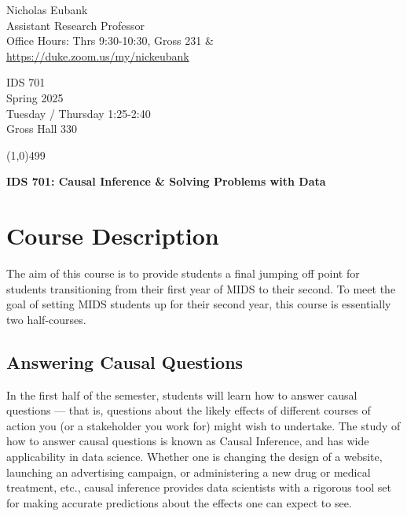 \documentclass[12pt]{article}
\begin{document}
\singlespacing






\thispagestyle{empty}
\begin{minipage}[t]{.5\textwidth}
	Nicholas Eubank \\
	 Assistant Research Professor\\
	 Office Hours: Thrs 9:30-10:30, Gross 231 \& \\
	 \url{https://duke.zoom.us/my/nickeubank}
     \vspace*{0.1cm}
\end{minipage}
\begin{minipage}[t]{.5\textwidth}
	\begin{flushright}  IDS 701 \\
	Spring 2025 \\
	Tuesday / Thursday 1:25-2:40 \\
	Gross Hall 330
\end{flushright}
\end{minipage}


\line(1,0){499}

\vspace{.35in}

\begin{center}
	\textbf{\LARGE{IDS 701: Causal Inference \& Solving Problems with Data} }
\end{center}



\section{Course Description}

The aim of this course is to provide students a final jumping off point for students transitioning from their first year of MIDS to their second. To meet the goal of setting MIDS students up for their second year, this course is essentially two half-courses. 

\subsection*{Answering Causal Questions}

In the first half of the semester, students will learn how to answer causal questions — that is, questions about the likely effects of different courses of action you (or a stakeholder you work for) might wish to undertake. The study of how to answer causal questions is known as Causal Inference, and has wide applicability in data science. Whether one is changing the design of a website, launching an advertising campaign, or administering a new drug or medical treatment, etc., causal inference provides data scientists with a rigorous tool set for making accurate predictions about the effects one can expect to see. 
\end{document}
